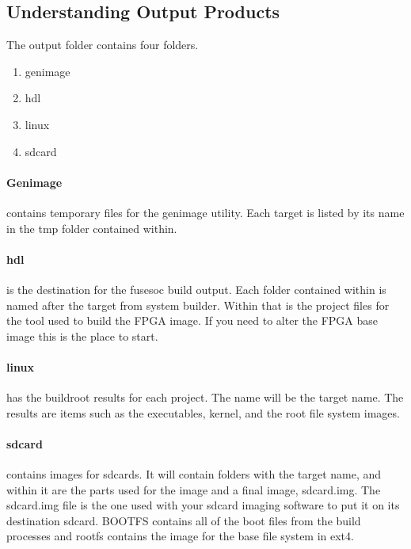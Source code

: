 \subsection{Understanding Output Products}

\par
The output folder contains four folders.
\begin{enumerate}
\item genimage
\item hdl
\item linux
\item sdcard
\end{enumerate}

\paragraph{Genimage} contains temporary files for the genimage utility. Each target is listed by its name in the tmp folder contained within.

\paragraph{hdl} is the destination for the fusesoc build output. Each folder contained within is named after the target from system builder.
Within that is the project files for the tool used to build the FPGA image. If you need to alter the FPGA base image this is the place to start.

\paragraph{linux} has the buildroot results for each project. The name will be the target name. The results are items such as the executables, kernel,
and the root file system images.

\paragraph{sdcard} contains images for sdcards. It will contain folders with the target name, and within it are the parts used for the image and a
final image, sdcard.img. The sdcard.img file is the one used with your sdcard imaging software to put it on its destination sdcard. BOOTFS contains
all of the boot files from the build processes and rootfs contains the image for the base file system in ext4.

